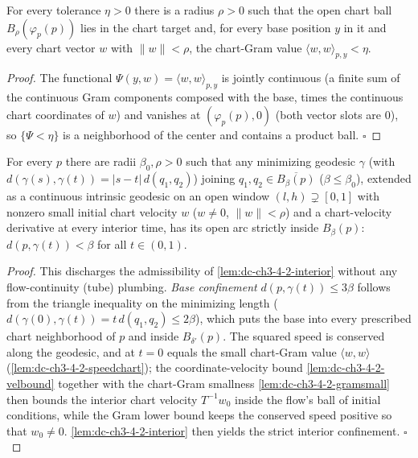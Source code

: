 \begin{lemma}
  \label{lem:dc-ch3-4-2-gramsmall}
  \leanok
  For every tolerance $\eta>0$ there is a radius $\rho>0$ such that the open chart ball
  $B_\rho(\varphi_p(p))$ lies in the chart target and, for every base position $y$ in it and every
  chart vector $w$ with $\|w\|<\rho$, the chart-Gram value $\langle w,w\rangle_{p,y}<\eta$.
\end{lemma}
\begin{proof}
  \leanok
  The functional $\Psi(y,w)=\langle w,w\rangle_{p,y}$ is jointly continuous (a finite sum of the
  continuous Gram components composed with the base, times the continuous chart coordinates of $w$)
  and vanishes at $(\varphi_p(p),0)$ (both vector slots are $0$), so $\{\Psi<\eta\}$ is a
  neighborhood of the center and contains a product ball. $\square$
\end{proof}

\begin{lemma}
  \label{lem:dc-ch3-4-2-interior-minimizing}
  \leanok
  For every $p$ there are radii $\beta_0,\rho>0$ such that any minimizing geodesic $\gamma$
  (with $d(\gamma(s),\gamma(t))=|s-t|\,d(q_1,q_2)$) joining $q_1,q_2\in\overline{B_\beta(p)}$
  ($\beta\le\beta_0$), extended as a continuous intrinsic geodesic on an open window
  $(l,h)\supsetneq[0,1]$ with nonzero small initial chart velocity $w$ ($w\neq0$, $\|w\|<\rho$) and a
  chart-velocity derivative at every interior time, has its open arc strictly inside $B_\beta(p)$:
  $d(p,\gamma(t))<\beta$ for all $t\in(0,1)$.
\end{lemma}
\begin{proof}
  \leanok
  This discharges the admissibility of \cref{lem:dc-ch3-4-2-interior} without any flow-continuity
  (tube) plumbing. \emph{Base confinement} $d(p,\gamma(t))\le3\beta$ follows from the triangle
  inequality on the minimizing length ($d(\gamma(0),\gamma(t))=t\,d(q_1,q_2)\le2\beta$), which puts
  the base into every prescribed chart neighborhood of $p$ and inside $B_{\delta'}(p)$. The squared
  speed is conserved along the geodesic, and at $t=0$ equals the small chart-Gram value
  $\langle w,w\rangle$ (\cref{lem:dc-ch3-4-2-speedchart}); the coordinate-velocity bound
  \cref{lem:dc-ch3-4-2-velbound} together with the chart-Gram smallness \cref{lem:dc-ch3-4-2-gramsmall}
  then bounds the interior chart velocity $T^{-1}w_0$ inside the flow's ball of initial conditions,
  while the Gram lower bound keeps the conserved speed positive so that $w_0\neq0$.
  \cref{lem:dc-ch3-4-2-interior} then yields the strict interior confinement. $\square$
\end{proof}

